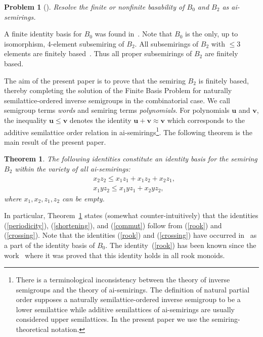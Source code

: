 \documentclass[12pt,draft]{amsart}
\newtheorem{problem}{Problem}
\newtheorem{theorem}{Theorem}
\begin{document}
\begin{problem}[{\!\cite[Problem~7.7(1)]{Jackson-22}}] Resolve the finite or nonfinite basabi\-lity of $B_0$ and $B_2$ as ai-semirings.
\end{problem}

A finite identity basis for $B_0$ was found in~\cite{Shaprynskii-24}. Note that $B_0$ is the only, up to isomorphism, 4-element subsemiring of $B_2$. All subsemi\-rings of $B_2$ with $\le3$ elements are finitely based~\cite{Zhao-20}. Thus all proper subsemirings of $B_2$ are finitely based.

The aim of the present paper is to prove that the semiring $B_2$ is finitely based, thereby completing the solution of the Finite Basis Problem for naturally semilattice-ordered inverse semigroups in the combinatorial case. We call semigroup terms \emph{words} and semiring terms \emph{polynomials}. For polynomials $\mathbf u$ and $\mathbf v$, the inequality $\mathbf u\le\mathbf v$ denotes the identity $\mathbf u+\mathbf v\approx\mathbf v$ which corresponds to the additive semilattice order relation in ai-semirings\footnote{There is a terminological inconsistency between the theory of inverse semigroups and the theory of ai-semirings. The definition of natural partial order supposes a naturally semilattice-ordered inverse semigroup to be a lower semilattice while additive semilattices of ai-semirings are usually considered upper semilattices. In the present paper we use the semiring-theoretical notation.}. The following theorem is the main result of the present paper.

\begin{theorem}
\label{main1}
The following identities constitute an identity basis for the semiring $B_2$ within the variety of all ai-semirings:
\begin{align}
\label{rook}
&x_2z_2\le x_1z_1+x_1z_2+x_2z_1,\\
\label{crossing}
&x_1yz_2\le x_1yz_1+x_2yz_2,
\end{align}
where $x_1,x_2,z_1,z_2$ can be empty.
\end{theorem}

In particular, Theorem~\ref{main1} states (somewhat counter-intuitively) that the identities (\ref{periodicity}), (\ref{shortening}), and (\ref{commut}) follow from (\ref{rook}) and (\ref{crossing}). Note that the identities (\ref{rook}) and (\ref{crossing}) have occurred in~\cite{Shaprynskii-24} as a part of the identity basis of $B_0$. The identity~(\ref{rook}) has been known since the work~\cite{Garvackii-71} where it was proved that this identity holds in all rook monoids.
\end{document}
